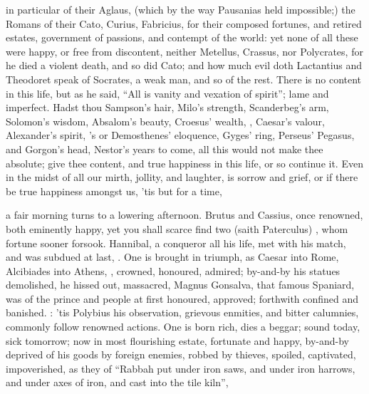 in particular of their Aglaus, 
(which by the way Pausanias held impossible;) the Romans of their
Cato, Curius, Fabricius, for their composed fortunes, and
retired estates, government of passions, and contempt of the world: yet none of
all these were happy, or free from discontent, neither Metellus, Crassus, nor
Polycrates, for he died a violent death, and so did Cato; and how much evil
doth Lactantius and Theodoret speak of Socrates, a weak man, and so of the
rest. There is no content in this life, but as he said,
\enquote{All is vanity and vexation of spirit}; lame and imperfect. Hadst thou
Sampson's hair, Milo's strength, Scanderbeg's arm, Solomon's wisdom, Absalom's
beauty, Croesus' wealth, , Caesar's valour, Alexander's
spirit, \Tully{}'s or Demosthenes' eloquence, Gyges' ring, Perseus' Pegasus, and
Gorgon's head, Nestor's years to come, all this would not make thee absolute;
give thee content, and true happiness in this life, or so continue it. Even in
the midst of all our mirth, jollity, and laughter, is sorrow and grief, or if
there be true happiness amongst us, 'tis but for a time,


a fair morning turns to a lowering afternoon. Brutus and Cassius, once
renowned, both eminently happy, yet you shall scarce find two (saith
Paterculus) , whom fortune sooner forsook.
Hannibal, a conqueror all his life, met with his match, and was subdued at
last, . One is brought in triumph, as
Caesar into Rome, Alcibiades into Athens, , crowned,
honoured, admired; by-and-by his statues demolished, he hissed out, massacred,
\etc{} Magnus Gonsalva, that famous Spaniard, was of the
prince and people at first honoured, approved; forthwith confined and banished.
: 'tis Polybius his observation, grievous enmities, and bitter
calumnies, commonly follow renowned actions. One is born rich, dies a beggar;
sound today, sick tomorrow; now in most flourishing estate, fortunate and
happy, by-and-by deprived of his goods by foreign enemies, robbed by thieves,
spoiled, captivated, impoverished, as they of \enquote{Rabbah put
under iron saws, and under iron harrows, and under axes of iron, and cast into
the tile kiln},

